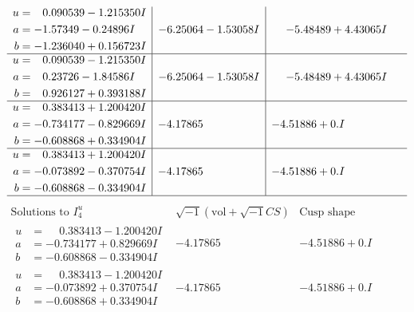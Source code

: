 \documentclass[1p]{elsarticle_modified}
\theoremstyle{definition}
\newcommand{\I}{\sqrt{-1}}
\begin{document}
$$\begin{array}{c|c|c}
\begin{aligned}
u &= \phantom{-}0.090539 - 1.215350 I \\
a &= -1.57349 - 0.24896 I \\
b &= -1.236040 + 0.156723 I\end{aligned}
 & -6.25064 - 1.53058 I & -5.48489 + 4.43065 I \\ \hline\begin{aligned}
u &= \phantom{-}0.090539 - 1.215350 I \\
a &= \phantom{-}0.23726 - 1.84586 I \\
b &= \phantom{-}0.926127 + 0.393188 I\end{aligned}
 & -6.25064 - 1.53058 I & -5.48489 + 4.43065 I \\ \hline\begin{aligned}
u &= \phantom{-}0.383413 + 1.200420 I \\
a &= -0.734177 - 0.829669 I \\
b &= -0.608868 + 0.334904 I\end{aligned}
 & -4.17865\phantom{ +0.000000I} & -4.51886 + 0. I\phantom{ +0.000000I} \\ \hline\begin{aligned}
u &= \phantom{-}0.383413 + 1.200420 I \\
a &= -0.073892 - 0.370754 I \\
b &= -0.608868 - 0.334904 I\end{aligned}
 & -4.17865\phantom{ +0.000000I} & -4.51886 + 0. I\phantom{ +0.000000I}\\
 \hline 
 \end{array}$$\newpage$$\begin{array}{c|c|c}  
\text{Solutions to }I^u_{4}& \I (\text{vol} + \sqrt{-1}CS) & \text{Cusp shape}\\
 \hline 
\begin{aligned}
u &= \phantom{-}0.383413 - 1.200420 I \\
a &= -0.734177 + 0.829669 I \\
b &= -0.608868 - 0.334904 I\end{aligned}
 & -4.17865\phantom{ +0.000000I} & -4.51886 + 0. I\phantom{ +0.000000I} \\ \hline\begin{aligned}
u &= \phantom{-}0.383413 - 1.200420 I \\
a &= -0.073892 + 0.370754 I \\
b &= -0.608868 + 0.334904 I\end{aligned}
 & -4.17865\phantom{ +0.000000I} & -4.51886 + 0. I\phantom{ +0.000000I} \\ \hline\begin{aligned}

\end{aligned}
\end{array}$$
\end{document}
